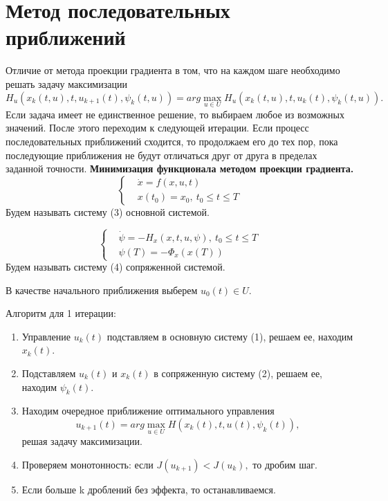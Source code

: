 \documentclass[oneside,final,12pt]{extreport}
\begin{document}
\section{Метод последовательных приближений} 
Отличие от метода проекции градиента в том, что на каждом шаге необходимо решать задачу максимизации
$$H_u(x_k(t,u),t,u_{k+1}(t),\psi_k(t,u))= arg \max \limits_{u \in U} H_u(x_k(t,u),t,u_k(t),\psi_k(t,u)).$$ Если задача имеет не единственное решение, то выбираем любое из возможных значений. После этого переходим к следующей итерации. 
Если процесс последовательных приближений сходится, то продолжаем его до тех пор, пока последующие приближения не будут отличаться друг от друга в пределах заданной точности.
\textbf{Минимизация функционала методом проекции градиента.}
\begin{equation}
\left \{\begin{aligned}
& \dot{x} = f(x,u,t)\\
& x(t_0)=x_0, \ t_0 \leqslant t \leqslant T
\end{aligned} \right. 
\end{equation}
Будем называть систему (3) основной системой.

\begin{equation}
\left \{
\begin{aligned}
& \dot{\psi} = -H_x(x,t,u,\psi),\ t_0 \leqslant t \leqslant T \\
& \psi(T) = -\Phi_x(x(T))
\end{aligned} \right.
\end{equation}
Будем называть систему (4) сопряженной системой.

В качестве начального приближения выберем $u_0(t) \in U$.

Алгоритм для 1 итерации:
\begin{enumerate}
\item Управление $u_k(t)$ подставляем в основную систему (1), решаем ее, находим $x_k(t)$.
\item Подставляем $u_k(t)$ и $x_k(t)$ в сопряженную систему (2), решаем ее, находим $\psi_k(t)$.
\item Находим очередное приближение оптимального управления $$u_{k+1}(t)= arg \max \limits_{u \in U} H(x_k(t),t,u(t),\psi_k(t)),$$ решая задачу максимизации.
\item Проверяем монотонность: если $J(u_{k+1})<J(u_k),$ то дробим шаг.
\item Если больше k дроблений без эффекта, то останавливаемся.
\end{enumerate}
\end{document}
